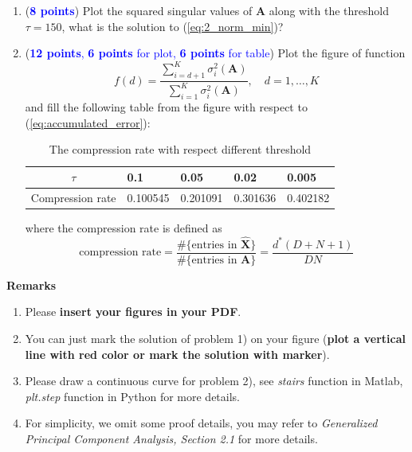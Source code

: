 \documentclass[english,onecolumn]{IEEEtran}
\begin{document}
\begin{enumerate}
    \item (\textcolor{blue}{\textbf{8 points}}) Plot the squared singular values of $\mathbf{A}$  along with the threshold $\tau=150$, what is the solution to (\ref{eq:2_norm_min})?
    \item (\textcolor{blue}{\textbf{12 points}, \textbf{6 points} for plot, \textbf{6 points} for table}) Plot the figure of function 
    \begin{equation}
        f(d)=\frac{\sum_{i=d+1}^K\sigma_{i}^2(\mathbf{A})}{\sum_{i=1}^K\sigma_i^2(\mathbf{A})},\quad d=1,\dots,K
    \end{equation}
    and fill the following table from the figure with respect to (\ref{eq:accumulated_error}):
    \begin{table}[htb]
    \centering
    \begin{tabular}{|l|l|l|l|l|}
    \hline
    \multicolumn{1}{|c|}{$\tau$} & 0.1 & 0.05 & 0.02 & 0.005 \\ \hline
    Compression rate             &  0.100545 & 0.201091   & 0.301636  & 0.402182 \\ \hline
    \end{tabular}
    \caption{The compression rate with respect different threshold}
    \label{tab.tab2}
    \end{table}
    
    where the compression rate is defined as 
    \begin{equation}
        \text{compression rate}=\frac{\#\{\text{entries in } \hat{\mathbf{X}}\}}{\#\{\text{entries in } \mathbf{A}\}}=\frac{d^*(D+N+1)}{DN}
    \end{equation}
\end{enumerate}



{\bf Remarks}
\begin{enumerate}
    \item Please \textbf{insert your figures in your PDF}.
    \item You can just mark the solution of problem 1) on your figure (\textbf{plot a vertical line with red color or mark the solution with marker}).
    \item Please draw a continuous curve for problem 2), see \textit{stairs} function in Matlab, \textit{plt.step} function in Python for more details.
    \item For simplicity, we omit some proof details, you may refer to \textit{Generalized Principal Component Analysis, Section 2.1} for more details.
\end{enumerate}
\end{document}
